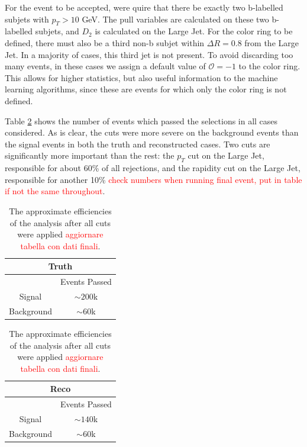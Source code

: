 \documentclass[10pt,a4paper]{book}
\newcommand\todo[1]{\textcolor{red}{#1}}
\begin{document}
For the event to be accepted, were quire that there be exactly two b-labelled subjets with $p_T > 10$ GeV. The pull variables are calculated on these two b-labelled subjets, and $D_2$ is calculated on the Large Jet. For the color ring to be defined, there must also be a third non-b subjet within $\Delta R = 0.8$ from the Large Jet. In a majority of cases, this third jet is not present. To avoid discarding too many events, in these cases we assign a default value of $\mathcal{O} = -1$ to the color ring. This allows for higher statistics, but also useful information to the machine learning algorithms, since these are events for which only the color ring is not defined.

Table \ref{Efficiencies table} shows the number of events which passed the selections in all cases considered. As is clear, the cuts were more severe on the background events than the signal events in both the truth and reconstructed cases. Two cuts are significantly more important than the rest: the $p_T$ cut on the Large Jet, responsible for about 60\% of all rejections, and the rapidity cut on the Large Jet, responsible for another 10\% \todo{check numbers when running final event, put in table if not the same throughout}.

\begin{table}[!htb]
    \label{Efficiencies table}
    \begin{minipage}{.5\linewidth}
      \centering
        \begin{tabular}{|c|c|}
		\hline 
		\multicolumn{2}{|c|}{\textbf{Truth}} \\ 
		\hline 
		\* & Events Passed \\ 
		\hline 
		Signal & $\sim 200$k \\ 
		\hline 
		Background & $\sim 60$k \\ 
		\hline 
		\end{tabular}  
    \end{minipage}%
    \begin{minipage}{.5\linewidth}
      \centering
        \begin{tabular}{|c|c|}
		\hline 
		\multicolumn{2}{|c|}{\textbf{Reco}} \\ 
		\hline 
		\* & Events Passed \\ 
		\hline 
		Signal & $\sim 140$k \\ 
		\hline 
		Background & $\sim 60$k \\ 
		\hline 
		\end{tabular} 
    \end{minipage} 
    \caption{The approximate efficiencies of the analysis after all cuts were applied \todo{aggiornare tabella con dati finali}.}
\end{table}
\end{document}

